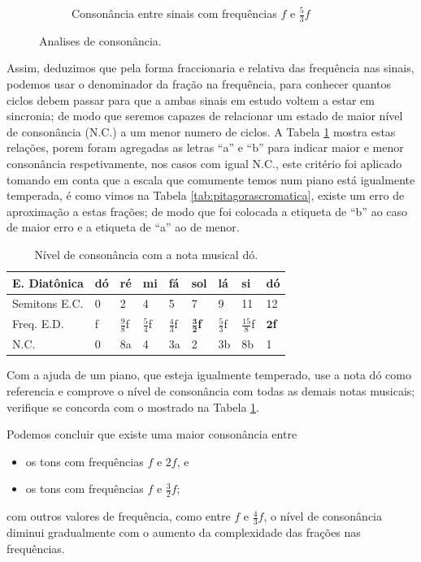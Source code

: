 \begin{figure}
\begin{subfigure}[b]{0.6\textwidth}
        \caption{Consonância entre sinais com frequências $f$ e $\frac{5}{3}f$}
        \label{fig:corda53}
    \end{subfigure}
\caption{Analises de consonância.}
\label{fig:consonanciaper}
\end{figure}

Assim, deduzimos que pela forma fraccionaria e relativa das frequência nas sinais, 
podemos usar o denominador da fração na frequência,
para conhecer quantos ciclos debem passar para que a ambas sinais em estudo voltem a estar em sincronia;
de modo que seremos capazes de relacionar um estado de maior nível de consonância (N.C.) a um menor numero de ciclos.
A Tabela \ref{tab:pitagorascromatica2} mostra estas relações, 
porem foram agregadas as letras ``a'' e ``b'' para indicar maior e menor consonância respetivamente,
nos casos com igual N.C., este critério foi aplicado tomando em conta que a escala
que comumente temos num piano está igualmente temperada,
é como vimos na Tabela  \ref{tab:pitagorascromatica},
existe um erro de aproximação a estas frações;
de modo que foi colocada a etiqueta de ``b'' ao caso de maior erro e a etiqueta de ``a'' ao de menor.
\begin{table}[h]
  \centering
  \begin{tabular}{|l|l|l|l|l|l|l|l|l|}
  \hline
  E. Diatônica    & dó & ré & mi & fá & sol & lá & si & dó \\ \hline
  \hline
  Semitons E.C.   & 0  & 2  & 4  & 5  & 7  & 9  & 11 & 12 \\ \hline
  Freq. E.D.  & f  & $\frac{9}{8}$f & $\frac{5}{4}$f & $\frac{4}{3}$f & $\mathbf{\frac{3}{2}}$\textbf{f} & $\frac{5}{3}$f & $\frac{15}{8}$f & $\mathbf{2}$\textbf{f}\\ \hline \hline
  N.C. &  0 & 8a & 4 & 3a & 2 & 3b & 8b & 1 \\ \hline
  \end{tabular}
  \caption{Nível de consonância com a nota musical dó.}
  \label{tab:pitagorascromatica2}
\end{table}

\begin{example}
Com a ajuda de um piano, que esteja igualmente temperado,
use a nota dó como referencia e comprove o nível de consonância com todas as demais notas musicais;
verifique se concorda com o mostrado na Tabela \ref{tab:pitagorascromatica2}.
\end{example}


Podemos concluir que existe uma maior consonância entre
\begin{itemize} 
\item os tons com frequências $f$ e $2f$, e 
\item os tons com frequências $f$ e $\frac{3}{2}f$;
\end{itemize}
com outros valores de frequência, 
como entre $f$ e $\frac{4}{3}f$, o nível de consonância diminui  
 gradualmente com o aumento da complexidade das frações nas frequências.

